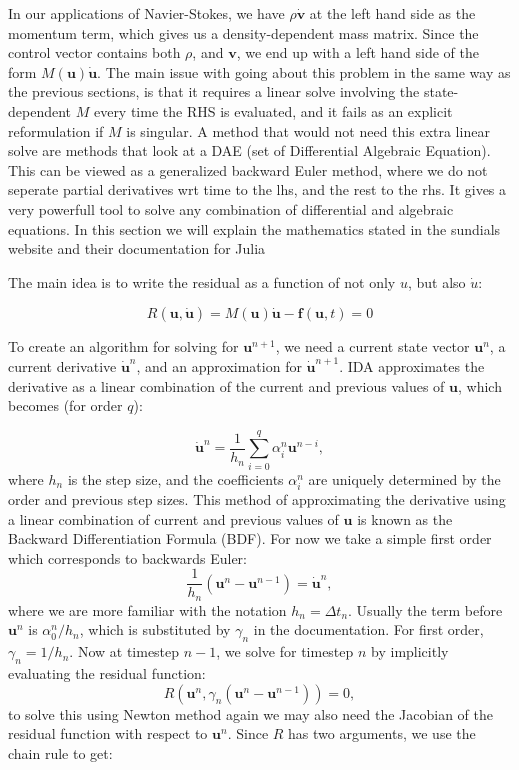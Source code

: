 In our applications of Navier-Stokes, we have $\rho \dot{\mathbf{v}}$ at the left hand side as the momentum term, which gives us a density-dependent mass matrix. Since the control vector contains both $\rho$, and $\mathbf{v}$, we end up with a left hand side of the form $M(\mathbf{u})\dot{\mathbf{u}}$. The main issue with going about this problem in the same way as the previous sections, is that it requires a linear solve involving the state-dependent $M$ every time the RHS is evaluated, and it fails as an explicit reformulation if $M$ is singular. A method that would not need this extra linear solve are methods that look at a DAE (set of Differential Algebraic Equation). This can be viewed as a generalized backward Euler method, where we do not seperate partial derivatives wrt time to the lhs, and the rest to the rhs. It gives a very powerfull tool to solve any combination of differential and algebraic equations. In this section we will explain the mathematics stated in the sundials website and their documentation for Julia\cite{sundials_ida_math,sciml_daeproblem}


The main idea is to write the residual as a function of not only $u$, but also $\dot{u}$:

\begin{equation}
    R(\mathbf{u},\dot{\mathbf{u}}) = M(\mathbf{u})\dot{\mathbf{u}} - \mathbf{f}(\mathbf{u},t) = 0
\end{equation}

To create an algorithm for solving for $\mathbf{u}^{n+1}$, we need a current state vector $\mathbf{u}^n$, a current derivative $\dot{\mathbf{u}}^n$, and an approximation for $\dot{\mathbf{u}}^{n+1}$. IDA approximates the derivative as a linear combination of the current and previous values of $\mathbf{u}$, which becomes (for order $q$):

\begin{equation}
    \dot{\mathbf{u}}^n = \frac{1}{h_n}\sum_{i=0}^q\alpha_{i}^n\mathbf{u}^{n-i},
\end{equation}
where $h_n$ is the step size, and the coefficients $\alpha_{i}^n$ are uniquely determined by the order and previous step sizes. This method of approximating the derivative using a linear combination of current and previous values of $\mathbf{u}$ is known as the Backward Differentiation Formula (BDF). For now we take a simple first order which corresponds to backwards Euler:
\begin{equation}
    \frac{1}{h_n}(\mathbf{u}^{n}-\mathbf{u}^{n-1})=\dot{\mathbf{u}}^n,
\end{equation}
where we are more familiar with the notation $h_n = \Delta t_n$. Usually the term before $\mathbf{u}^n$ is $\alpha_0^n/h_n$, which is substituted by $\gamma_n$ in the documentation. For first order, $\gamma_n = 1/h_n$. Now at timestep $n-1$, we solve for timestep $n$ by implicitly evaluating the residual function: 
\begin{equation}
    R(\mathbf{u}^{n},\gamma_n(\mathbf{u}^{n}-\mathbf{u}^{n-1})) = 0, 
\end{equation}
to solve this using Newton method again we may also need the Jacobian of the residual function with respect to $\mathbf{u}^n$. Since $R$ has two arguments, we use the chain rule to get:

